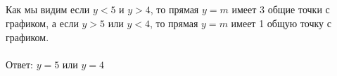 \documentclass{article}
\begin{document}
	\\
	\\
	\\
	\\
	\\
	\\
	\\
	\\
	\\
	Как мы видим если $y < 5$ и $y>4$, то прямая $y=m$ имеет 3 общие точки с графиком, а если $y > 5$ или $y < 4$, то прямая $y = m$ имеет 1 общую точку с графиком.\\
	\\
	Ответ: $y = 5$ или $y = 4$
\end{document}
